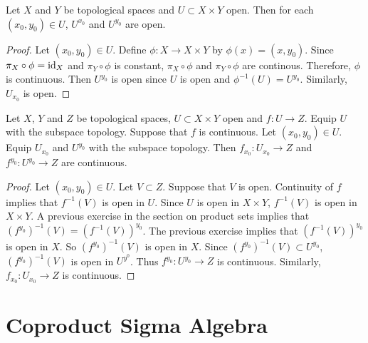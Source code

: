 \documentclass{book}
\begin{document}
	\begin{ex}
		Let $X$ and $Y$ be topological spaces and $U \subset X \times Y$ open. Then for each $(x_0,  y_0) \in U$, $U^{x_0}$ and $U^{y_0}$ are open.
	\end{ex}
	
	\begin{proof}
		Let $(x_0, y_0) \in U$. Define $\phi: X \rightarrow X \times Y$ by $\phi(x) = (x, y_0)$. Since $\pi_X \circ \phi = \operatorname{id}_X$ and $\pi_Y \circ \phi$ is constant, $\pi_X \circ \phi$ and $\pi_Y \circ \phi$ are continous. Therefore, $\phi$ is continuous. Then $U^{y_0}$ is open since $U$ is open and $\phi^{-1}(U) = U^{y_0}$. Similarly, $U_{x_0}$ is open.
	\end{proof}
	
	\begin{ex}
		Let $X$, $Y$ and $Z$ be topological spaces, $U \subset X \times Y$ open and $f: U \rightarrow Z$. Equip $U$ with the subspace topology. Suppose that $f$ is continuous. Let $(x_0, y_0) \in U$. Equip $U_{x_0}$ and $U^{y_0}$ with the subspace topology. Then $f_{x_0}:U_{x_0} \rightarrow Z$ and $f^{y_0}: U^{y_0} \rightarrow Z$ are continuous.
	\end{ex}
	
	\begin{proof}
		Let $(x_0, y_0) \in U$. Let $V \subset Z$. Suppose that $V$ is open. Continuity of $f$ implies that $f^{-1}(V)$ is open in $U$. Since $U$ is open in $X \times Y$, $f^{-1}(V)$ is open in $X \times Y$. A previous exercise in the section on product sets implies that $(f^{y_0})^{-1}(V) = (f^{-1}(V))^{y_0}$. The previous exercise implies that $(f^{-1}(V))^{y_0}$ is open in $X$. So $(f^{y_0})^{-1}(V)$ is open in $X$. Since $(f^{y_0})^{-1}(V) \subset U^{y_0}$, $(f^{y_0})^{-1}(V)$ is open in $U^{y^0}$. Thus $f^{y_0}: U^{y_0} \rightarrow Z$ is continuous. Similarly, $f_{x_0}: U_{x_0} \rightarrow Z$ is continuous.
	\end{proof}


	
	
	
	
	
	
	
	
	
	
	
	
	
	
	
	
	
	
	\newpage
	\section{Coproduct Sigma Algebra}
	
\end{document}

